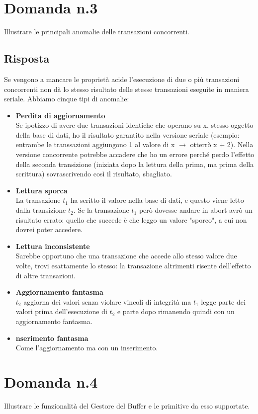 \documentclass{article}
\begin{document}
\section*{Domanda n.3}
Illustrare le principali anomalie delle transazioni concorrenti.
\subsection*{Risposta}
Se vengono a mancare le proprietà acide l'esecuzione di due o più transazioni concorrenti non dà lo stesso risultato delle stesse transazioni eseguite in maniera seriale. Abbiamo cinque tipi di anomalie:
\begin{itemize}
    \item \textbf{Perdita di aggiornamento}\\ Se ipotizzo di avere due transazioni identiche che operano su x, stesso oggetto della base di dati, ho il risultato garantito nella versione seriale (esempio: entrambe le transsazioni aggiungono 1 al valore di x $\rightarrow$ otterrò x + 2). Nella versione concorrente potrebbe accadere che ho un errore perché perdo l'effetto della seconda transizione (iniziata dopo la lettura della prima, ma prima della scrittura) sovrascrivendo così il risultato, sbagliato.
    \item \textbf{Lettura sporca}\\ La transazione $t_1$ ha scritto il valore nella base di dati, e questo viene letto dalla transizione $t_2$. Se la transazione $t_1$ però dovesse andare in abort avrò un risultato errato: quello che succede è che leggo un valore "sporco", a cui non dovrei poter accedere.
    \item \textbf{Lettura inconsistente}\\Sarebbe opportuno che una transazione che accede allo stesso valore due volte, trovi esattamente lo stesso: la transazione altrimenti risente dell'effetto di altre transazioni. 
    \item \textbf{Aggiornamento fantasma}\\ $t_2$ aggiorna dei valori senza violare vincoli di integrità ma $t_1$ legge parte dei valori prima dell'esecuzione di $t_2$ e parte dopo rimanendo quindi con un aggiornamento fantasma.
    \item \textbf{nserimento fantasma}\\Come l'aggiornamento ma con un inserimento.
\end{itemize}

\section*{Domanda n.4}
Illustrare le funzionalità del Gestore del Buffer e le primitive da esso supportate.
\end{document}
